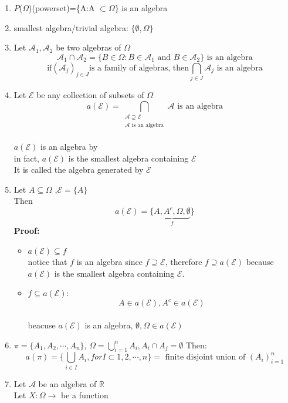 \begin{enumerate}[label=\circled{\arabic*}]
\item $ P $($ \Omega $)(powerset)=\{A:A $\subset \Omega \} $ is an algebra
\item smallest algebra/trivial algebra: $ \{\emptyset,\Omega \} $
\item Let $ \mathcal{A}_1,\mathcal{A}_2 $ be two algebras of $ \Omega $ $$
\mathcal{A}_1 \cap \mathcal{A}_2 =\{ B\in \Omega:B\in \mathcal{A}_1 \text{   and   }B \in \mathcal{A}_2\} \text{    is an algebra}
$$ 
$$
    \text{if} {(\mathcal{A}_j)}_{j\in J} \text{is a family of algebras, then} \bigcap_{j\in J}\mathcal{A}_j \text{  is an algebra}
$$ 
\item Let $\mathcal{E} $ be any collection of subsets of $ \Omega $ 
$$
    a(\mathcal{E})=\bigcap_{\substack{{\mathcal{A} \supseteq  \mathcal{E}}\\{\mathcal{A} \text{   is an algebra}}}}\mathcal{A} \text{    is an algebra}
$$
\\$ a(\mathcal{E}) $ is an algebra by 
\\in fact, $a(\mathcal{E})$ is the smallest algebra containing $\mathcal{E}$
\\It is called the algebra generated by $\mathcal{E}$
\item Let $ A \subseteq \Omega$ ,$ \mathcal{E}=\{A\} $ 
\\Then$$
    a(\mathcal{E})=\{\underbrace{A,A^c,\Omega,\emptyset}_f\}
$$ 
\textbf{Proof:}
\begin{itemize}
    \item $a(\mathcal{E}) \subseteq f$
\\notice that $ f $ is an algebra since $ f\supseteq \mathcal{E} $, therefore $ f \supseteq a(\mathcal{E}) $ because $ a(\mathcal{E}) $ is the smallest algebra containing $ \mathcal{E} $.
 \item $f\subseteq a(\mathcal{E})$:
$$
    A\in a(\mathcal{E}), A^c \in a(\mathcal{E})
$$ 
\\beacuse $a(\mathcal{E})$ is an algebra, $\emptyset,\Omega \in a(\mathcal{E})$
\end{itemize}
\item $\pi =\{A_1,A_2,\cdots ,A_n\}$, $ \Omega=\bigcup_{i=1}^{n}A_i,A_i\cap A_j=\emptyset $ 
Then:$$
    a(\pi)=\{\bigcup_{i\in I}A_i,for I\subset {1,2,\cdots, n}\}=\text{    finite disjoint union of   } {(A_i)}_{i=1}^{n}
$$ 
\item Let $\mathcal{A} $ be an algebra of $\mathbb{R}$
\\Let $ X:\Omega \rightarrow $ be a function 

\end{enumerate}
